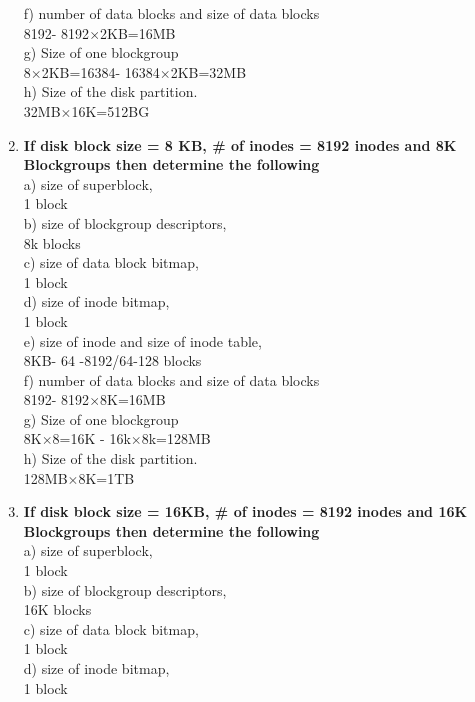 \documentclass[a4paper,12pt]{article}
\begin{document}
\begin{flushleft}
\begin{enumerate}
f) number of data blocks and size of data blocks
\\{\color{red}8192- 8192$\times$2KB=16MB}\\
g) Size of one blockgroup
\\{\color{red}8$\times$2KB=16384- 16384$\times$2KB=32MB}\\
h) Size of the disk partition.
\\{\color{red}32MB$\times$16K=512BG}\\
\item \textbf{ If disk block size = 8 KB, \# of inodes = 8192 inodes and 8K Blockgroups then determine the following}\\
a) size of superblock,
\\{\color{red}1 block}\\
b) size of blockgroup descriptors,
\\{\color{red}8k blocks}\\
c) size of data block bitmap,
\\{\color{red}1 block}\\
d) size of inode bitmap,
\\{\color{red}1 block}\\
e) size of inode and size of inode table,
\\{\color{red}8KB- 64 -8192/64-128 blocks}\\
f) number of data blocks and size of data blocks
\\{\color{red}8192- 8192$\times$8K=16MB}\\
g) Size of one blockgroup
\\{\color{red}8K$\times$8=16K - 16k$\times$8k=128MB}\\
h) Size of the disk partition.
\\{\color{red}128MB$\times$8K=1TB}\\
\item \textbf{ If disk block size = 16KB, \# of inodes = 8192 inodes and 16K Blockgroups then determine the following}\\
a) size of superblock,
\\{\color{red}1 block}\\
b) size of blockgroup descriptors,
\\{\color{red}16K blocks}\\
c) size of data block bitmap,
\\{\color{red}1 block}\\
d) size of inode bitmap,
\\{\color{red}1 block}\\

\end{enumerate}
\end{flushleft}
\end{document}

